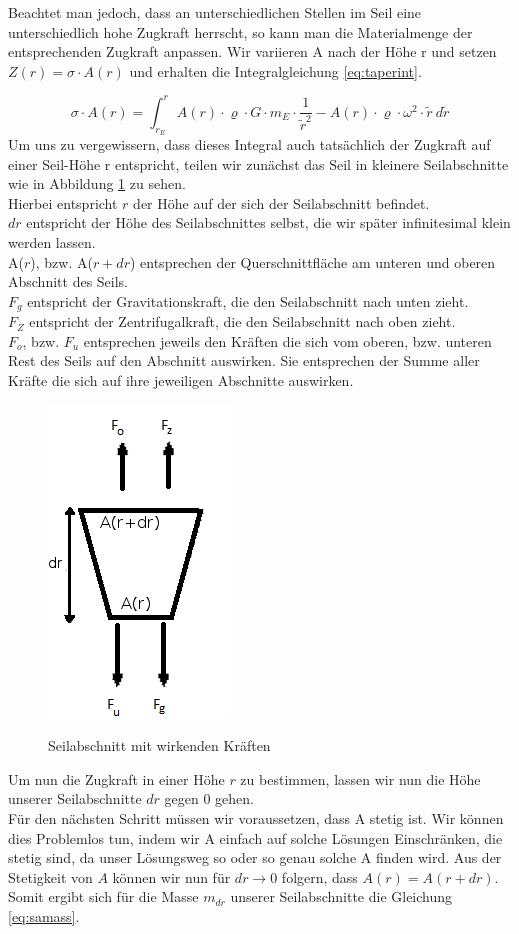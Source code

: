 \documentclass[a4paper, 10pt]{report}
\begin{document}
Beachtet man jedoch, dass an unterschiedlichen Stellen im Seil eine unterschiedlich hohe Zugkraft herrscht, so kann man die Materialmenge der entsprechenden Zugkraft anpassen.
Wir variieren A nach der Höhe r und setzen $Z(r) = \sigma \cdot A(r)$ und erhalten die Integralgleichung \ref{eq:taperint}.

\begin{equation}
\sigma \cdot A(r) = \int_{r_E}^{r} A(r) \cdot \varrho \cdot G \cdot m_E \cdot \frac{1}{\tilde{r}^2} - A(r) \cdot \varrho \cdot \omega^2 \cdot \tilde{r}\ d\tilde{r}
\label{eq:taperint}
\end{equation}
Um uns zu vergewissern, dass dieses Integral auch tatsächlich der Zugkraft auf einer Seil-Höhe r entspricht, teilen wir zunächst das Seil in kleinere Seilabschnitte wie in Abbildung \ref{fig:differential} zu sehen.\\
Hierbei entspricht $r$ der Höhe auf der sich der Seilabschnitt befindet.\\
$dr$ entspricht der Höhe des Seilabschnittes selbst, die wir später infinitesimal klein werden lassen.\\
A($r$), bzw. A($r+dr$) entsprechen der Querschnittfläche am unteren und oberen Abschnitt des Seils.\\
$F_g$ entspricht der Gravitationskraft, die den Seilabschnitt nach unten zieht.\\
$F_Z$ entspricht der Zentrifugalkraft, die den Seilabschnitt nach oben zieht.\\
$F_o$, bzw. $F_u$ entsprechen jeweils den Kräften die sich vom oberen, bzw. unteren Rest des Seils auf den Abschnitt auswirken. Sie entsprechen der Summe aller Kräfte die sich auf ihre jeweiligen Abschnitte auswirken.
\begin{figure}[!htb]
	\centering
	\includegraphics{differential}
	\label{fig:differential}
	\caption{Seilabschnitt mit wirkenden Kräften}
\end{figure}
Um nun die Zugkraft in einer Höhe $r$ zu bestimmen, lassen wir nun die Höhe unserer Seilabschnitte $dr$ gegen 0 gehen.\\
Für den nächsten Schritt müssen wir voraussetzen, dass A stetig ist. Wir können dies Problemlos tun, indem wir A einfach auf solche Lösungen Einschränken, die stetig sind, da unser Lösungsweg so oder so genau solche A finden wird. Aus der Stetigkeit von $A$ können wir nun für $dr \rightarrow 0$ folgern, dass $A(r)=A(r+dr)$. Somit ergibt sich für die Masse $m_{dr}$ unserer Seilabschnitte die Gleichung \ref{eq:samass}.
\end{document}
